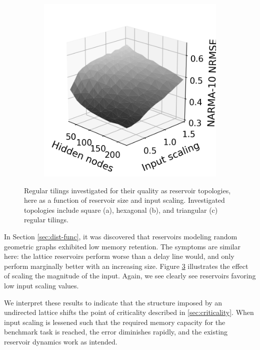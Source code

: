 \begin{figure}[t]
\begin{subfigure}{.32\textwidth}
    \caption{}
    \label{fig:rt-is-hex}
  \end{subfigure}
  \begin{subfigure}{.32\textwidth}
    \centering
    \includegraphics[width=1.0\linewidth]{figures/regular-tilings-performance-is-tri.png}
    \caption{}
    \label{fi:rt-is-tri}
  \end{subfigure}
  \caption{
    Regular tilings investigated for their quality as reservoir topologies, here
as a function of reservoir size and input scaling. Investigated topologies
include square (a), hexagonal (b), and triangular (c) regular tilings.
  }
  \label{fig:rt-performance-is}
\end{figure}

In Section \ref{sec:dist-func}, it was discovered that reservoirs modeling
random geometric graphs exhibited low memory retention. The symptoms are similar
here: the lattice reservoirs perform worse than a delay line would, and only
perform marginally better with an increasing size. Figure
\ref{fig:rt-performance-is} illustrates the effect of scaling the magnitude of
the input. Again, we see clearly see reservoirs favoring low input scaling
values.

We interpret these results to indicate that the structure imposed by an
undirected lattice shifts the point of criticality described in
\ref{sec:criticality}. When input scaling is lessened such that the required
memory capacity for the benchmark task is reached, the error diminishes rapidly,
and the existing reservoir dynamics work as intended.

